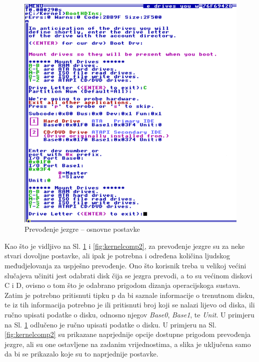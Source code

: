 \documentclass{foi}
\begin{document}
\begin{figure}[H]
    \centering
    \includegraphics[width=1.0\textwidth]{slike/kernelcomp1.png}
	\caption{Prevođenje jezgre – osnovne postavke}
    \label{fig:kernelcomp1}
\end{figure}

Kao što je vidljivo na Sl. \ref{fig:kernelcomp1} i \ref{fig:kernelcomp2}, za prevođenje jezgre su za neke stvari dovoljne postavke, ali ipak je potrebna i određena količina ljudskog međudjelovanja za uspješno prevođenje. Ono što korisnik treba u velikoj većini slučajeva učiniti jest odabrati disk čija se jezgra prevodi, a to su većinom diskovi {\selectfont C} i {\selectfont D}, ovisno o tom što je odabrano prigodom dizanja operacijskoga sustava. Zatim je potrebno pritisnuti tipku {\selectfont p} da bi saznale informacije o trenutnom disku, te iz tih informacija potrebno je ili pritisnuti broj koji se nalazi lijevo od diska, ili ručno upisati podatke o disku, odnosno njegov \emph{Base0}, \emph{Base1}, te \emph{Unit}. U primjeru na Sl. \ref{fig:kernelcomp1} odlučeno je ručno upisati podatke o disku. U primjeru na Sl. \ref{fig:kernelcomp2} su prikazane naprjednije opcije dostupne prigodom prevođenja jezgre, ali su one ostavljene na zadanim vrijednostima, a slika je uključena samo da bi se prikazalo koje su to naprjednije postavke.
\end{document}
